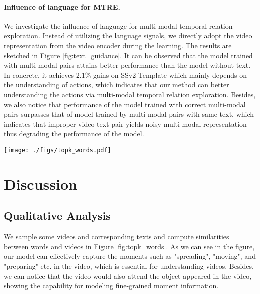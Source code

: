 \documentclass[10pt,twocolumn,letterpaper]{article}
\begin{document}
\paragraph{Influence of language for MTRE.}
We investigate the influence of language for multi-modal temporal relation exploration. Instead of utilizing the language signals, we directly adopt the video representation  from the video encoder during the learning. The results are sketched in Figure \ref{fig:text_guidance}. It can be observed that the model trained with multi-modal pairs attains better performance than the model without text. In concrete, it achieves 2.1\% gains on SSv2-Template which mainly depends on the understanding of actions, which indicates that our method can better understanding the actions via multi-modal temporal relation exploration. Besides, we also notice that performance of the model trained with correct multi-modal pairs surpasses that of model trained by multi-modal pairs with same text, which indicates that improper video-text pair yields noisy multi-modal representation thus degrading the performance of the model.

\begin{figure*}
    \centering
    \texttt{[image: ./figs/topk\_words.pdf]}
    \vspace{-1ex}
    \caption{Examples of similarities between words and videos generated by our method. Our method captures the atomic actions in the videos as well as the object information with the help of cross-modal moment exploration.}
\label{fig:topk_words}
\end{figure*}


\section{Discussion}
\subsection{Qualitative Analysis}
We sample some videos and corresponding texts and compute similarities between words and videos in Figure \ref{fig:topk_words}. As we can see in the figure, our model can effectively capture the moments such as "spreading", "moving", and "preparing" etc. in the video, which is essential for understanding videos. Besides, we can notice that the video would also attend the object appeared in the video, showing the capability for modeling fine-grained moment information.
\end{document}
